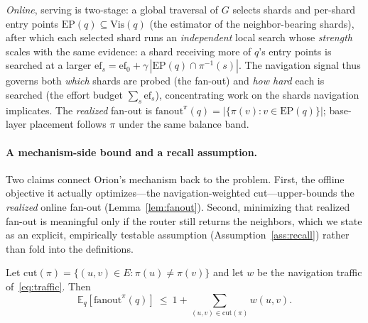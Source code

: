 \emph{Online}, serving is two-stage: a global traversal of $G$ selects shards and
per-shard entry points $\mathrm{EP}(q)\subseteq\mathrm{Vis}(q)$ (the estimator of
the neighbor-bearing shards), after which each selected shard runs an
\emph{independent} local search whose \emph{strength} scales with the same
evidence: a shard receiving more of $q$'s entry points is searched at a larger
$\mathrm{ef}_s=\mathrm{ef}_0+\gamma\,|\mathrm{EP}(q)\cap\pi^{-1}(s)|$. The
navigation signal thus governs both \emph{which} shards are probed (the fan-out)
and \emph{how hard} each is searched (the effort budget $\sum_s\mathrm{ef}_s$),
concentrating work on the shards navigation implicates. The \emph{realized}
fan-out is
$\mathrm{fanout}^\pi(q)=|\{\pi(v):v\in\mathrm{EP}(q)\}|$; base-layer placement
follows $\pi$ under the same balance band.

\paragraph{A mechanism-side bound and a recall assumption.}
Two claims connect Orion's mechanism back to the problem. First, the offline
objective it actually optimizes---the navigation-weighted cut---upper-bounds the
\emph{realized} online fan-out (Lemma~\ref{lem:fanout}). Second, minimizing that
realized fan-out is meaningful only if the router still returns the neighbors,
which we state as an explicit, empirically testable assumption
(Assumption~\ref{ass:recall}) rather than fold into the definitions.

\begin{lemma}
\label{lem:fanout}
Let $\mathrm{cut}(\pi)=\{(u,v)\in E:\pi(u)\neq\pi(v)\}$ and let $w$ be the
navigation traffic of~\eqref{eq:traffic}. Then
\[
\mathbb{E}_{q}\!\left[\mathrm{fanout}^\pi(q)\right]
\ \le\ 1+\!\!\sum_{(u,v)\in\mathrm{cut}(\pi)}\!\! w(u,v).
\]
\end{lemma}

